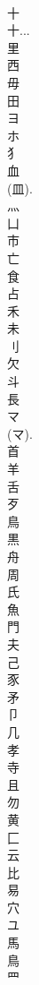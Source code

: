 \documentclass[8pt]{extreport}
\begin{document}
\begin{CJK}{UTF8}{min}
\\	十 
\\	十... 
\\	里	
\\	西	
\\	毋	
\\	田 
\\	ヨ	
\\	ホ	
\\	犭	
\\	血	
\\	(皿). 
\\	灬	
\\	凵	
\\	市	
\\	亡	
\\	食	
\\	占	
\\	禾	
\\	未	
\\	刂	
\\	欠	
\\	斗	
\\	長	
\\	マ	
\\	(マ). 
\\	首	
\\	羊	
\\	舌	
\\	歹	
\\	鳥	
\\	黒	
\\	舟	
\\	周	
\\	氏	
\\	魚	
\\	門	
\\	夫	
\\	己	
\\	豕	
\\	矛	
\\	卩	
\\	几	
\\	孝	
\\	寺	
\\	且	
\\	勿	
\\	黄	
\\	匚	
\\	云	
\\	比	
\\	易	
\\	穴	
\\	ユ	
\\	馬	
\\	鳥 
\\	罒	

\end{CJK}
\end{document}

